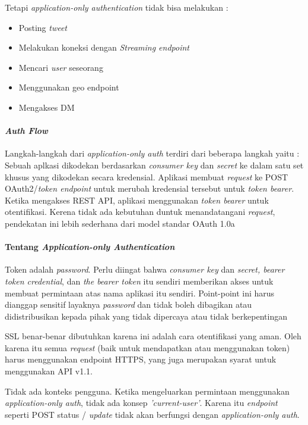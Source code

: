 Tetapi \textit{application-only authentication} tidak bisa melakukan :

\begin{itemize}
	\item Posting \textit{tweet}
	\item Melakukan koneksi dengan \textit{Streaming endpoint}
	\item Mencari \textit{user} seseorang
	\item Menggunakan geo endpoint
	\item Mengakses DM
\end{itemize}

\paragraph{\textit{Auth Flow}}
Langkah-langkah dari \textit{application-only auth} terdiri dari beberapa langkah yaitu :
Sebuah aplkasi dikodekan berdasarkan \textit{consumer key} dan \textit{secret} ke dalam satu set khusus yang dikodekan secara kredensial.
Aplikasi membuat \textit{request} ke POST OAuth2/\textit{token endpoint} untuk merubah kredensial tersebut untuk \textit{token bearer}.
Ketika mengakses REST API, aplikasi menggunakan \textit{token bearer} untuk otentifikasi.
Kerena tidak ada kebutuhan duntuk menandatangani \textit{request}, pendekatan ini lebih sederhana dari model standar OAuth 1.0a

\paragraph{Tentang \textit{Application-only Authentication}}
Token adalah \textit{password}. Perlu diingat bahwa \textit{consumer key} dan \textit{secret, bearer token credential}, dan \textit{the bearer token} itu sendiri memberikan akses untuk membuat permintaan atas nama aplikasi itu sendiri. Point-point ini harus dianggap sensitif layaknya \textit{password} dan tidak boleh dibagikan atau didistribusikan kepada pihak yang tidak dipercaya atau tidak berkepentingan

SSL benar-benar dibutuhkan karena ini adalah cara otentifikasi yang aman. Oleh karena itu semua \textit{request} (baik untuk mendapatkan atau menggunakan token) harus menggunakan endpoint HTTPS, yang juga merupakan syarat untuk menggunakan API v1.1.

Tidak ada konteks pengguna. Ketika mengeluarkan permintaan menggunakan \textit{application-only auth}, tidak ada konsep \textit{'current-user'}. Karena itu \textit{endpoint} seperti POST status / \textit{update} tidak akan berfungsi dengan \textit{application-only auth}.

